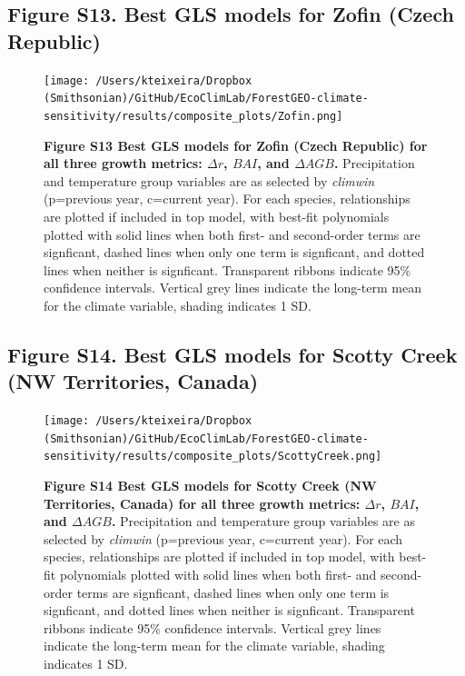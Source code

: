 \documentclass[
]{article}
\begin{document}
\newpage

\hypertarget{figure-s13.-best-gls-models-for-zofin-czech-republic}{%
\subsection{Figure S13. Best GLS models for Zofin (Czech
Republic)}\label{figure-s13.-best-gls-models-for-zofin-czech-republic}}

\begin{figure}
\centering
\texttt{[image: /Users/kteixeira/Dropbox (Smithsonian)/GitHub/EcoClimLab/ForestGEO-climate-sensitivity/results/composite\_plots/Zofin.png]}
\caption{\textbf{Figure S13 \textbar{} Best GLS models for Zofin (Czech
Republic) for all three growth metrics: \(\Delta r\), \(BAI\), and
\(\Delta AGB\).} Precipitation and temperature group variables are as
selected by \emph{climwin} (p=previous year, c=current year). For each
species, relationships are plotted if included in top model, with
best-fit polynomials plotted with solid lines when both first- and
second-order terms are signficant, dashed lines when only one term is
signficant, and dotted lines when neither is signficant. Transparent
ribbons indicate 95\% confidence intervals. Vertical grey lines indicate
the long-term mean for the climate variable, shading indicates 1 SD.}
\end{figure}

\newpage

\hypertarget{figure-s14.-best-gls-models-for-scotty-creek-nw-territories-canada}{%
\subsection{Figure S14. Best GLS models for Scotty Creek (NW
Territories,
Canada)}\label{figure-s14.-best-gls-models-for-scotty-creek-nw-territories-canada}}

\begin{figure}
\centering
\texttt{[image: /Users/kteixeira/Dropbox (Smithsonian)/GitHub/EcoClimLab/ForestGEO-climate-sensitivity/results/composite\_plots/ScottyCreek.png]}
\caption{\textbf{Figure S14 \textbar{} Best GLS models for Scotty Creek
(NW Territories, Canada) for all three growth metrics: \(\Delta r\),
\(BAI\), and \(\Delta AGB\).} Precipitation and temperature group
variables are as selected by \emph{climwin} (p=previous year, c=current
year). For each species, relationships are plotted if included in top
model, with best-fit polynomials plotted with solid lines when both
first- and second-order terms are signficant, dashed lines when only one
term is signficant, and dotted lines when neither is signficant.
Transparent ribbons indicate 95\% confidence intervals. Vertical grey
lines indicate the long-term mean for the climate variable, shading
indicates 1 SD.}
\end{figure}
\end{document}
